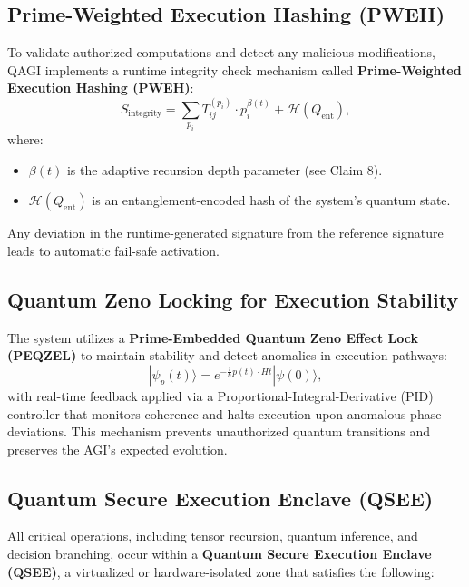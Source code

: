\documentclass{article}
\theoremstyle{plain}
\theoremstyle{claimstyle}
\begin{document}
\subsection{Prime-Weighted Execution Hashing (PWEH)}

To validate authorized computations and detect any malicious modifications, QAGI implements a runtime integrity check mechanism called \textbf{Prime-Weighted Execution Hashing (PWEH)}:
\begin{equation}
S_{\text{integrity}} = \sum_{p_i} T_{ij}^{(p_i)} \cdot p_i^{\beta(t)} + \mathcal{H}(Q_{\text{ent}}),
\end{equation}
where:
\begin{itemize}
    \item \( \beta(t) \) is the adaptive recursion depth parameter (see Claim 8).
    \item \( \mathcal{H}(Q_{\text{ent}}) \) is an entanglement-encoded hash of the system’s quantum state.
\end{itemize}
Any deviation in the runtime-generated signature from the reference signature leads to automatic fail-safe activation.

\subsection{Quantum Zeno Locking for Execution Stability}

The system utilizes a \textbf{Prime-Embedded Quantum Zeno Effect Lock (PEQZEL)} to maintain stability and detect anomalies in execution pathways:
\begin{equation}
|\psi_p(t)\rangle = e^{ -\frac{i}{\hbar} p(t) \cdot H t } |\psi(0)\rangle,
\end{equation}
with real-time feedback applied via a Proportional-Integral-Derivative (PID) controller that monitors coherence and halts execution upon anomalous phase deviations. This mechanism prevents unauthorized quantum transitions and preserves the AGI’s expected evolution.

\subsection{Quantum Secure Execution Enclave (QSEE)}

All critical operations, including tensor recursion, quantum inference, and decision branching, occur within a \textbf{Quantum Secure Execution Enclave (QSEE)}, a virtualized or hardware-isolated zone that satisfies the following:
\end{document}
